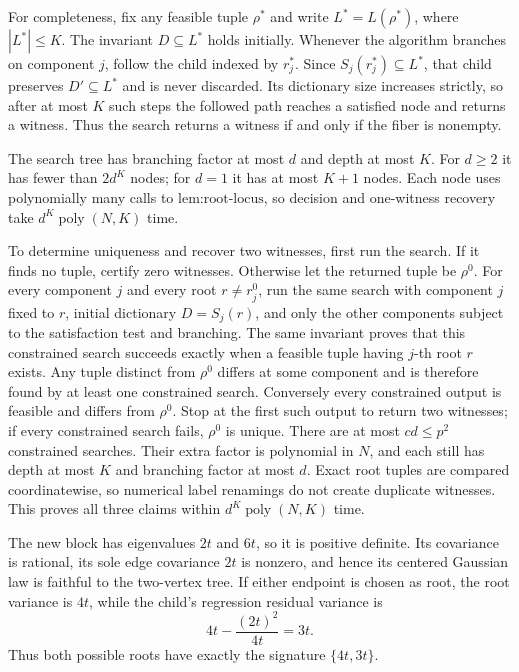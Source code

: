 For completeness, fix any feasible tuple \(\rho^*\) and write \(L^*=L(\rho^*)\), where \(|L^*|\le K\).  The invariant \(D\subseteq L^*\) holds initially.  Whenever the algorithm branches on component \(j\), follow the child indexed by \(r_j^*\).  Since \(S_j(r_j^*)\subseteq L^*\), that child preserves \(D'\subseteq L^*\) and is never discarded.  Its dictionary size increases strictly, so after at most \(K\) such steps the followed path reaches a satisfied node and returns a witness.  Thus the search returns a witness if and only if the fiber is nonempty.

The search tree has branching factor at most \(d\) and depth at most \(K\).  For \(d\ge2\) it has fewer than \(2d^K\) nodes; for \(d=1\) it has at most \(K+1\) nodes.  Each node uses polynomially many calls to \(\text{lem:root-locus}\), so decision and one-witness recovery take \(d^K\operatorname{poly}(N,K)\) time.

To determine uniqueness and recover two witnesses, first run the search.  If it finds no tuple, certify zero witnesses.  Otherwise let the returned tuple be \(\rho^0\).  For every component \(j\) and every root \(r\ne r_j^0\), run the same search with component \(j\) fixed to \(r\), initial dictionary \(D=S_j(r)\), and only the other components subject to the satisfaction test and branching.  The same invariant proves that this constrained search succeeds exactly when a feasible tuple having \(j\)-th root \(r\) exists.  Any tuple distinct from \(\rho^0\) differs at some component and is therefore found by at least one constrained search.  Conversely every constrained output is feasible and differs from \(\rho^0\).  Stop at the first such output to return two witnesses; if every constrained search fails, \(\rho^0\) is unique.  There are at most \(cd\le p^2\) constrained searches.  Their extra factor is polynomial in \(N\), and each still has depth at most \(K\) and branching factor at most \(d\).  Exact root tuples are compared coordinatewise, so numerical label renamings do not create duplicate witnesses.  This proves all three claims within \(d^K\operatorname{poly}(N,K)\) time.

The new block has eigenvalues \(2t\) and \(6t\), so it is positive definite.  Its covariance is rational, its sole edge covariance \(2t\) is nonzero, and hence its centered Gaussian law is faithful to the two-vertex tree.  If either endpoint is chosen as root, the root variance is \(4t\), while the child's regression residual variance is
\[
 4t-\frac{(2t)^2}{4t}=3t.
\]
Thus both possible roots have exactly the signature \(\{4t,3t\}\).

